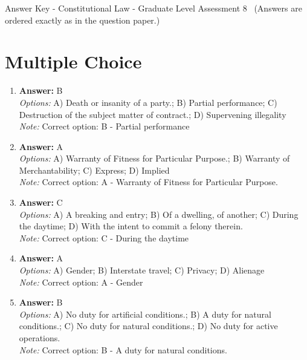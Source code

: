 \documentclass[12pt]{article}
\begin{document}
\begin{center}
Answer Key - Constitutional Law - Graduate Level Assessment 8 \
\small (Answers are ordered exactly as in the question paper.)
\end{center}

\section*{Multiple Choice}
\begin{enumerate}[label=\arabic*.]
\item \textbf{Answer:} B
\\ \textit{Options:} A) Death or insanity of a party.; B) Partial performance; C) Destruction of the subject matter of contract.; D) Supervening illegality
\\ \textit{Note:} Correct option: B - Partial performance
\item \textbf{Answer:} A
\\ \textit{Options:} A) Warranty of Fitness for Particular Purpose.; B) Warranty of Merchantability; C) Express; D) Implied
\\ \textit{Note:} Correct option: A - Warranty of Fitness for Particular Purpose.
\item \textbf{Answer:} C
\\ \textit{Options:} A) A breaking and entry; B) Of a dwelling, of another; C) During the daytime; D) With the intent to commit a felony therein.
\\ \textit{Note:} Correct option: C - During the daytime
\item \textbf{Answer:} A
\\ \textit{Options:} A) Gender; B) Interstate travel; C) Privacy; D) Alienage
\\ \textit{Note:} Correct option: A - Gender
\item \textbf{Answer:} B
\\ \textit{Options:} A) No duty for artificial conditions.; B) A duty for natural conditions.; C) No duty for natural conditions.; D) No duty for active operations.
\\ \textit{Note:} Correct option: B - A duty for natural conditions.
\end{enumerate}
\end{document}
